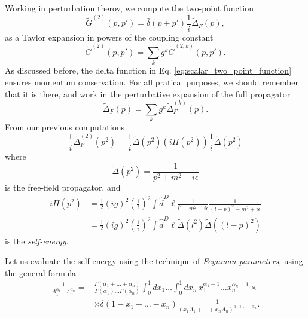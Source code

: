 \documentclass{article}
\numberwithin{equation}{section}
\begin{document}
Working in perturbation theroy, we compute the two-point function
\begin{equation} \label{eq:scalar_two_point_function}
    \tilde{G}^{(2)}(p, p') = \hat{\delta}(p + p')\frac{1}{i}\tilde{\Delta}_F(p),
\end{equation}
as a Taylor expansion in powers of the coupling constant 
\begin{equation}
    \tilde{G}^{(2)}(p, p') = \sum_k g^k\tilde{G}^{(2,k)}(p, p'). 
\end{equation}
As discussed before, the delta function in Eq. \ref{eq:scalar_two_point_function} ensures momentum conservation. For all pratical purposes, we should remember that it is there, and work in the perturbative expansion of the full propagator 
\begin{equation}
    \tilde{\Delta}_F(p) = \sum_k g^k \tilde{\Delta}_F^{(k)}(p).
\end{equation}
From our previous computations %
\begin{equation}
    \frac{1}{i}\tilde{\Delta}_F^{(2)}(p^2) = \frac{1}{i} \tilde{\Delta}(p^2) \left(i \Pi(p^2)\right) \frac{1}{i} \tilde{\Delta}(p^2)
\end{equation}
where 
\begin{equation}
    \tilde{\Delta}(p^2) = \frac{1}{p^2 + m^2 + i\epsilon}
\end{equation}
is the free-field propagator, and 
\begin{equation}
\begin{aligned}
    i\Pi(p^2) &= \frac{1}{2}(ig)^2 \left(\frac{1}{i}\right)^2 \int \hat{d}^D\ell \frac{1}{l^2 - m^2 + i\epsilon} \frac{1}{(l - p)^2 - m^2 + i\epsilon}\\
    &= \frac{1}{2}(ig)^2 \left(\frac{1}{i}\right)^2 \int \hat{d}^D\ell \tilde{\Delta}(l^2) \tilde{\Delta}((l-p)^2)
\end{aligned}
\end{equation}
is the \textit{self-energy}.

Let us evaluate the self-energy using the technique of \textit{Feynman parameters}, using the general formula 
\begin{equation}
\begin{aligned}
    \frac{1}{A_1^{\alpha_1} \dots A_n^{\alpha_n}} = &\frac{\Gamma(\alpha_1 + \dots + \alpha_n)}{\Gamma(\alpha_1) \dots \Gamma(\alpha_n)} \int_0^1 dx_1 \dots \int_0^1 dx_n \, x_1^{\alpha_1 - 1} \dots x_n^{\alpha_n - 1} \times \\
    &\times \delta(1 - x_1 - \dots - x_n) \frac{1}{\left(x_1 A_1 + \dots + x_n A_n\right)^{\alpha_1 + \dots + \alpha_n}}.
\end{aligned}
\end{equation}
\end{document}
